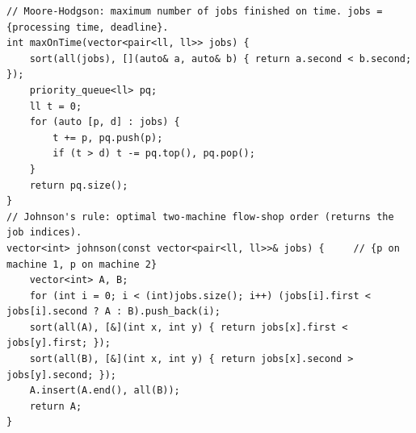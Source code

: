 \documentclass[9pt,a4paper,twocolumn]{extarticle}
\begin{document}
\begin{lstlisting}
// Moore-Hodgson: maximum number of jobs finished on time. jobs = {processing time, deadline}.
int maxOnTime(vector<pair<ll, ll>> jobs) {
    sort(all(jobs), [](auto& a, auto& b) { return a.second < b.second; });
    priority_queue<ll> pq;
    ll t = 0;
    for (auto [p, d] : jobs) {
        t += p, pq.push(p);
        if (t > d) t -= pq.top(), pq.pop();
    }
    return pq.size();
}
// Johnson's rule: optimal two-machine flow-shop order (returns the job indices).
vector<int> johnson(const vector<pair<ll, ll>>& jobs) {     // {p on machine 1, p on machine 2}
    vector<int> A, B;
    for (int i = 0; i < (int)jobs.size(); i++) (jobs[i].first < jobs[i].second ? A : B).push_back(i);
    sort(all(A), [&](int x, int y) { return jobs[x].first < jobs[y].first; });
    sort(all(B), [&](int x, int y) { return jobs[x].second > jobs[y].second; });
    A.insert(A.end(), all(B));
    return A;
}
\end{lstlisting}

\filbreak
\end{document}
